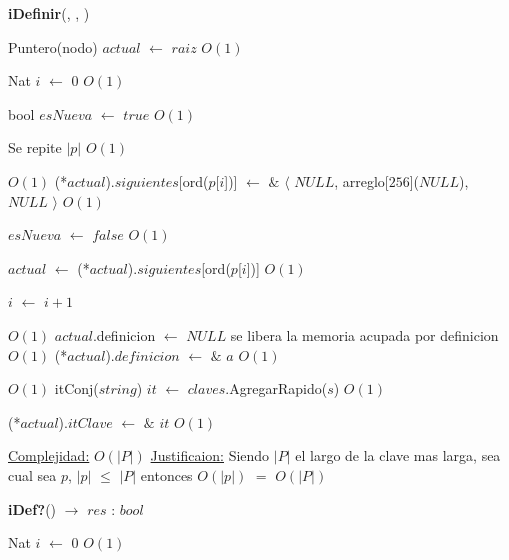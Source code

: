 \begin{Algoritmos}
\begin{algorithm}[H]
\begin{algorithmic}[1]
\end{algorithmic}
\end{algorithm}
  

\begin{algorithm}[H]
{\textbf{iDefinir}(, , )}
\begin{algorithmic}[1]

\State Puntero(nodo) $actual$ $\gets$ $raiz$ \Comment $O(1)$

\State Nat $i$ $\gets$ $0$ \Comment $O(1)$

\State bool $esNueva$ $\gets$ $true$ \Comment $O(1)$

   \Comment Se repite $|p|$ $O(1)$
	
	
	 \Comment $O(1)$
		\State (*$actual$).$siguientes$[ord($p$[$i$])] $\gets$	 $\&$ $\langle$ $NULL$, arreglo[$256$]($NULL$), $NULL$ $\rangle$  \Comment $O(1)$
		
		\State $esNueva$ $\gets$ $false$ \Comment $O(1)$	 
	
	\EndIf
	
	\State $actual$ $\gets$ (*$actual$).$siguientes$[ord($p$[$i$])] \Comment $O(1)$

	\State $i$ $\gets$ $i + 1$
\EndWhile 

 \Comment $O(1)$
	\State $actual$.definicion $\gets$ $NULL$ \Comment se libera la memoria acupada por definicion $O(1)$
\EndIf
\State (*$actual$).$definicion$ $\gets$ $\&$ $a$ \Comment $O(1)$

 \Comment $O(1)$
	\State itConj($string$) $it$ $\gets$  $claves$.AgregarRapido($s$) \Comment $O(1)$
	
	\State (*$actual$).$itClave$ $\gets$ $\&$ $it$ \Comment $O(1)$
\EndIf

\medskip
\State \underline{Complejidad:} $O(|P|)$
\State \underline{Justificaion:} Siendo $|P|$ el largo de la clave mas larga, sea cual sea $p$, $|p|$ $\leq$ $|P|$ entonces 	$O(|p|)$ $=$ $O(|P|)$


\end{algorithmic}
\end{algorithm}  
  
  
\begin{algorithm}[H]
{\textbf{iDef?}() $\to$ $res$ : $bool$}
\begin{algorithmic}[1]

\State Nat $i$ $\gets$ $0$ \Comment $O(1)$


\end{algorithmic}
\end{algorithm}
\end{Algoritmos}
